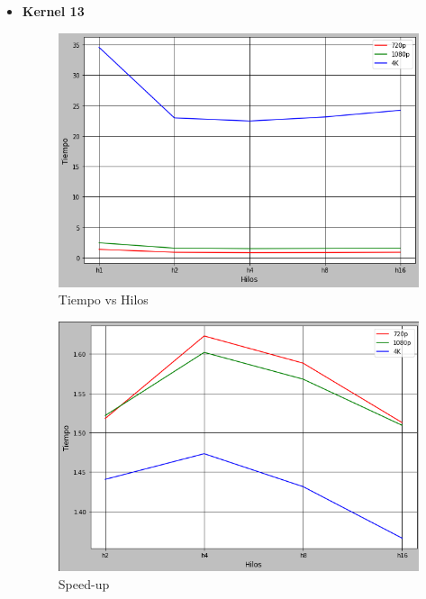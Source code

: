 \documentclass[a4paper,10pt]{IEEEtran}
\begin{document}
\begin{itemize}
    \item \textbf{Kernel 13} 
        \begin{figure}[H]
            \centering
            \includegraphics[scale = 0.3]{images/kD.png}
            \caption{Tiempo vs Hilos}
            \label{f05}
        \end{figure}{}
        
        \begin{figure}[H]
            \centering
            \includegraphics[scale = 0.3]{images/kDs.png}
            \caption{Speed-up}
            \label{f05a}
        \end{figure}{}
        

\end{itemize}
\end{document}
